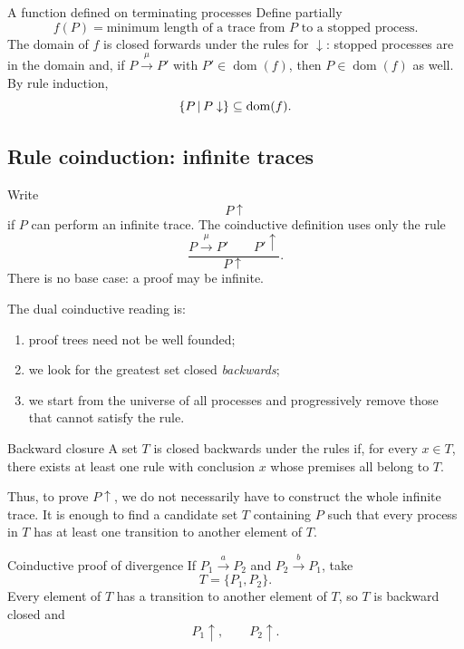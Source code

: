 \documentclass[a4paper]{article}
\newcommand{\dom}{\operatorname{dom}}
\newcommand{\trans}[1]{\xrightarrow{#1}}
\begin{document}
\begin{snippetexample}{A function defined on terminating processes}
    Define partially
    \[
        f(P)=\text{minimum length of a trace from \(P\) to a stopped process}.
    \]
    The domain of \(f\) is closed forwards under the rules for \(\downarrow\): stopped processes are in the domain and, if \(P\trans{\mu}P'\) with \(P'\in\dom(f)\), then \(P\in\dom(f)\) as well.
    By rule induction,
    \[
        \{P\suchthat P\downarrow\}\subseteq\dom(f).
    \]
\end{snippetexample}

\subsection{Rule coinduction: infinite traces}

Write
\[
    P\uparrow
\]
if \(P\) can perform an infinite trace.
The coinductive definition uses only the rule
\[
    \frac{P\trans{\mu}P'\qquad P'\uparrow}{P\uparrow}.
\]
There is no base case: a proof may be infinite.

The dual coinductive reading is:
\begin{enumerate}
    \item proof trees need not be well founded;
    \item we look for the greatest set closed \emph{backwards};
    \item we start from the universe of all processes and progressively remove those that cannot satisfy the rule.
\end{enumerate}

\begin{snippetdefinition}{Backward closure}
    A set \(T\) is closed backwards under the rules if, for every \(x\in T\), there exists at least one rule with conclusion \(x\) whose premises all belong to \(T\).
\end{snippetdefinition}

Thus, to prove \(P\uparrow\), we do not necessarily have to construct the whole infinite trace.
It is enough to find a candidate set \(T\) containing \(P\) such that every process in \(T\) has at least one transition to another element of \(T\).

\begin{snippetexample}{Coinductive proof of divergence}
    If \(P_1\trans{a}P_2\) and \(P_2\trans{b}P_1\), take
    \[
        T=\{P_1,P_2\}.
    \]
    Every element of \(T\) has a transition to another element of \(T\), so \(T\) is backward closed and
    \[
        P_1\uparrow,
        \qquad
        P_2\uparrow.
    \]
\end{snippetexample}
\end{document}
